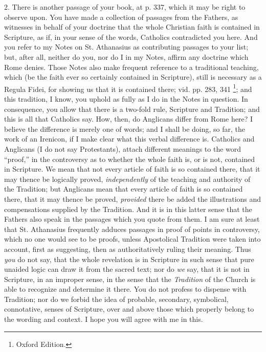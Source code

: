 2. There is another passage of your book, at p. 337, which it may be
right to observe upon. You have made a collection of passages from the
Fathers, as witnesses in behalf of your doctrine that the whole
Christian faith is contained in Scripture, as if, in your sense of the
words, Catholics contradicted you here. And you refer to my Notes on St.
Athanasius as contributing passages to your list; but, after all,
neither do you, nor do I in my Notes, affirm any doctrine which Rome
denies. Those Notes also make frequent reference to a traditional
teaching, which (be the faith ever so certainly contained in Scripture),
still is necessary as a Regula Fidei, for showing us that it is
contained there; vid. pp. 283, 341 \footnote{Oxford Edition.}; and this tradition, I know, you uphold as fully as I do in
the Notes in question. In consequence, you allow that there is a
two-fold rule, Scripture and Tradition; and this is all that Catholics
say. How, then, do Anglicans differ from Rome here? I believe the
difference is merely one of words; and I shall be doing, so far, the
work of an Irenicon, if I make clear what this verbal difference is.
Catholics and Anglicans (I do not say Protestants), attach different
meanings to the word ``proof,'' in the controversy as to whether
the whole faith is, or is not, contained in Scripture. We mean that not
every article of faith is so contained there, that it may thence be
logically proved, \emph{independently} of the teaching and authority of
the Tradition; but Anglicans mean that every article of faith is so
contained there, that it may thence be proved, \emph{provided} there be
added the illustrations and compensations supplied by the Tradition. And
it is in this latter sense that the Fathers also speak in the passages
which you quote from them. I am sure at least that St. Athanasius
frequently adduces passages in proof of points in controversy, which no
one would see to be proofs, unless Apostolical Tradition were taken into
account, first as suggesting, then as authoritatively ruling their
meaning. Thus \emph{you} do not say, that the whole revelation is in
Scripture in such sense that pure unaided logic can draw it from the
sacred text; nor do \emph{we} say, that it is not in Scripture, in an
improper sense, in the sense that the \emph{Tradition} of the Church is
able to recognize and determine it there. You do not profess to dispense
with Tradition; nor do we forbid the idea of probable, secondary,
symbolical, connotative, senses of Scripture, over and above those which
properly belong to the wording and context. I hope you will agree with
me in this.

